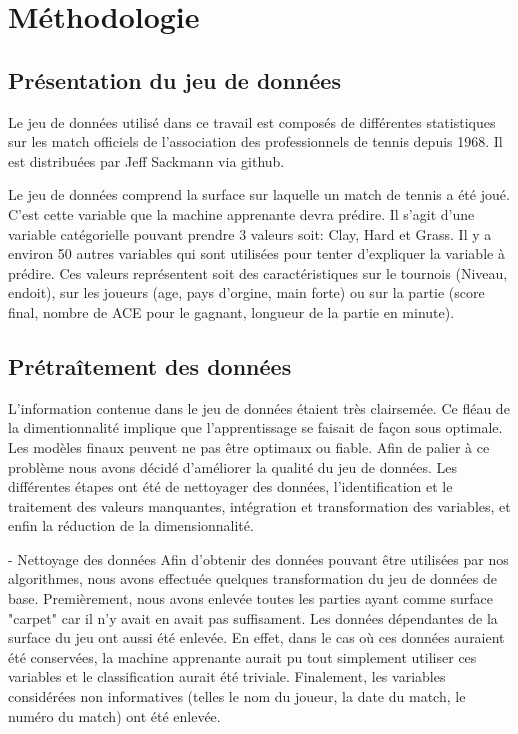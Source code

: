 \section{Méthodologie}

\subsection{Présentation du jeu de données}
Le jeu de données utilisé dans ce travail est composés de différentes statistiques sur les match officiels de l'association des professionnels de tennis depuis 1968. Il est distribuées par Jeff Sackmann via github. 

Le jeu de données comprend la surface sur laquelle un match de tennis a été joué. C'est cette variable que la machine apprenante devra prédire.  Il s'agit d'une variable catégorielle pouvant prendre 3 valeurs  soit: Clay, Hard et Grass. Il y a environ 50 autres variables qui sont utilisées pour tenter d'expliquer la variable à prédire. Ces valeurs représentent soit des caractéristiques sur le tournois (Niveau, endoit), sur les joueurs (age, pays d'orgine, main forte) ou sur la partie (score final, nombre de ACE pour le gagnant, longueur de la partie en minute).


\subsection{Prétraîtement des données}
L'information contenue dans le jeu de données étaient très clairsemée. Ce fléau de la dimentionnalité implique que l'apprentissage se faisait de façon sous optimale. Les modèles finaux peuvent ne pas être optimaux ou fiable. Afin de palier à ce problème nous avons décidé d'améliorer la qualité du jeu de données. Les différentes étapes ont été de nettoyager des données, l'identification et le traitement des valeurs manquantes, intégration et transformation des variables, et enfin la réduction de la dimensionnalité.

- Nettoyage des données
Afin d'obtenir des données pouvant être utilisées par nos algorithmes, nous avons effectuée quelques transformation du jeu de données de base. Premièrement, nous avons enlevée toutes les parties ayant comme surface "carpet" car il n'y avait en avait pas suffisament. Les données dépendantes de la surface du jeu ont aussi été enlevée. En effet, dans le cas où ces données auraient été conservées, la machine apprenante aurait pu tout simplement utiliser ces variables et le classification aurait été triviale. Finalement, les variables considérées non informatives (telles le nom du joueur, la date du match, le numéro du match) ont été enlevée.

